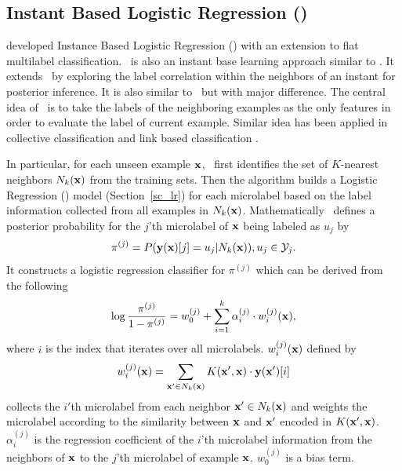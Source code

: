 {%
%
\subsection{Instant Based Logistic Regression (\iblr)} \label{sc_iblr}

\citet{Cheng09combining} developed Instance Based Logistic Regression (\iblr) with an extension to flat multilabel classification.
\iblr\ is also an instant base learning approach \citep{Aha91instance} similar to \mlknn.
It extends \mlknn\ by exploring the label correlation within the neighbors of an instant for posterior inference.
It is also similar to \cc\ but with major difference.
The central idea of \iblr\ is to take the labels of the neighboring examples as the only features in order to evaluate the label of current example.
Similar idea has been applied in collective classification \citep{Ghamrawi05collective} and link based classification \citep{Getoor05link, Getoor07introduction}.

In particular, for each unseen example $\mathbf {x}$, \iblr\ first identifies the set of $K$-nearest neighbors $N_k(\mathbf {x})$ from the training sets.
Then the algorithm builds a Logistic Regression (\lr) model (Section~\ref{sc_lr}) for each microlabel based on the label information collected from all examples in $N_k(\mathbf {x})$.
Mathematically \iblr\ defines a posterior probability for the $j$'th microlabel of $\mathbf {x}$ being labeled as $u_j$ by
\begin{align*}
	\pi^{(j)} = P( \mathbf {y}(\mathbf {x})[j]=u_j | N_k(\mathbf {x})), u_j\in\mathcal{Y}_j.
\end{align*}
It constructs a logistic regression classifier for $\pi^{(j)}$ which can be derived from the following 
\begin{align*}
	\log\frac{\pi^{(j)}}{1-\pi^{(j)}} = w_0^{(j)} + \sum_{i=1}^{k}\alpha_i^{(j)}\cdot w_{i}^{(j)}(\mathbf {x}),
\end{align*}
where $i$ is the index that iterates over all microlabels.
$w_i^{(j)}(\mathbf {x})$ defined by 
\begin{align*}
	w_i^{(j)}(\mathbf {x}) = \sum_{\mathbf {x}'\in N_k(\mathbf {x})}K(\mathbf {x}',\mathbf {x})\cdot \mathbf {y}(\mathbf {x}')[i]
\end{align*}
collects the $i'$th microlabel from each neighbor $\mathbf {x}'\in N_k(\mathbf {x})$ and weights the microlabel according to the similarity between $\mathbf {x}$ and $\mathbf {x}'$ encoded in $K(\mathbf {x}',\mathbf {x})$.
$\alpha_i^{(j)}$ is the regression coefficient of the $i$'th microlabel information from the neighbors of $\mathbf {x}$ to the $j$'th microlabel of example $\mathbf {x}$.
$w_0^{(j)}$ is a bias term.



}
